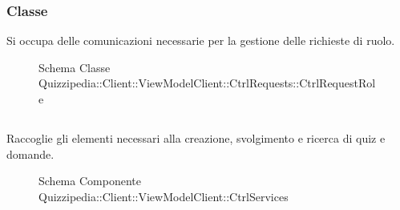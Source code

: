 \subsubsection{Classe }
Si occupa delle comunicazioni necessarie per la gestione delle richieste di ruolo.
\begin{figure}[H]
\centering
\noindent{}
\caption[Schema Classe CtrlRequestRole]{Schema Classe Quizzipedia::Client::ViewModelClient::CtrlRequests::CtrlRequestRole}
\end{figure}
\subsection{}
Raccoglie gli elementi necessari alla creazione, svolgimento e ricerca di quiz e domande.
\begin{figure}[H]
\centering
\noindent{}
\caption[Schema Componente Quizzipedia::Client::ViewModelClient::CtrlServices]{Schema Componente Quizzipedia::Client::ViewModelClient::CtrlServices}
\end{figure}
